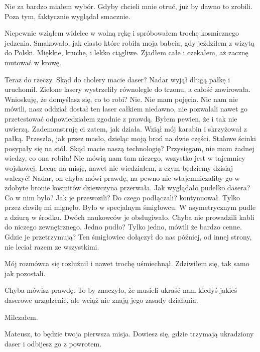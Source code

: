 Nie za bardzo miałem wybór. 
Gdyby chcieli mnie otruć, już by dawno to zrobili.
Poza tym, faktycznie wyglądał smacznie.

Niepewnie wziąłem widelec w wolną rękę i spróbowałem trochę kosmicznego jedzenia.
Smakowało, jak ciasto które robiła moja babcia, gdy jeździłem z wizytą do Polski.
Miękkie, kruche, i lekko ciągliwe.
Zjadłem całe i czekałem, aż zacznę mutować w krowę.

\begin{dialogue}
\ds{} Teraz do rzeczy. Skąd do cholery macie daser? \dm{} Nadar wyjął długą pałkę i uruchomił. Zielone lasery wystrzeliły równolegle do trzonu, a całość zawirowała.
\dm{} Wnioskuję, że domyślasz się, co to robi?
\ds{} Nie. Nie mam pojęcia. Nic nam nie mówili, nasz oddział dostał ten laser całkiem niedawno, nie pozwalali nawet go przetestować \dm{} odpowiedziałem zgodnie z prawdą. 
Byłem pewien, że i tak nie uwierzą.
\ds{} Zademonstruję ci zatem, jak działa. \dm{} Wziął mój karabin i skrzyżował z pałką. 
Przeszła, jak przez masło, dzieląc moją broń na dwie części. Stalowe ścinki posypały się na stół. \dm{} Skąd macie naszą technologię?
\ds{} Przysięgam, nie mam żadnej wiedzy, co ona robiła! Nie mówią nam tam niczego, wszystko jest w tajemnicy wojskowej. 
Lecąc na misję, nawet nie wiedziałem, z czym będziemy dzisiaj walczyć!
\ds{} Nadar, on chyba mówi prawdę, na pewno nie wtajemniczaliby go w zdobyte bronie kosmitów \dm{} dziewczyna przerwała.
\ds{} Jak wyglądało pudełko dasera? Co w nim było? Jak je przewozili? Do czego podłączali? \dm{} kontynuował.
\ds{} Tylko przez chwilę mi mignęło. Było w specjalnym śmigłowcu. W asymetrycznym pudle z dziurą w środku. Dwóch naukowców je obsługiwało. Chyba nie prowadzili kabli do niczego zewnętrznego.
\ds{} Jedno pudło?
\ds{} Tylko jedno, mówili że bardzo cenne.
\ds{} Gdzie je przetrzymują?
\ds{} Ten śmigłowiec dołączył do nas później, od innej strony, nie leciał razem ze wszystkimi.
\end{dialogue}

Mój rozmówca się rozluźnił i nawet trochę uśmiechnął.
Zdziwiłem się, tak samo jak pozostali.

\begin{dialogue}
\ds{} Chyba mówisz prawdę. To by znaczyło, że musieli ukraść nam kiedyś jakieś daserowe urządzenie, ale wciąż nie znają jego zasady działania.
\end{dialogue}

Milczałem.

\begin{dialogue}
\ds{} Mateusz, to będzie twoja pierwsza misja. Dowiesz się, gdzie trzymają ukradziony daser i odbijesz go z powrotem. 
\end{dialogue}

